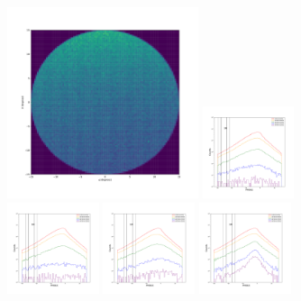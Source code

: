 \documentclass[12pt,prd]{article}
\begin{document}
\begin{figure}[h!]
\centering
\includegraphics[width=0.5\textwidth]{../figures/histogram2dgaiascan_l78_8_b58_4_ra224_7_dec46_3_npy.pdf}
\includegraphics[width=0.24\textwidth]{../figures/scanning_plotsgaiascan_l78_8_b58_4_ra224_7_dec46_3_npy_0.pdf}
\includegraphics[width=0.24\textwidth]{../figures/scanning_plotsgaiascan_l78_8_b58_4_ra224_7_dec46_3_npy_1.pdf}
\includegraphics[width=0.24\textwidth]{../figures/scanning_plotsgaiascan_l78_8_b58_4_ra224_7_dec46_3_npy_2.pdf}
\includegraphics[width=0.24\textwidth]{../figures/scanning_plotsgaiascan_l78_8_b58_4_ra224_7_dec46_3_npy_3.pdf}

\end{figure}
\end{document}
